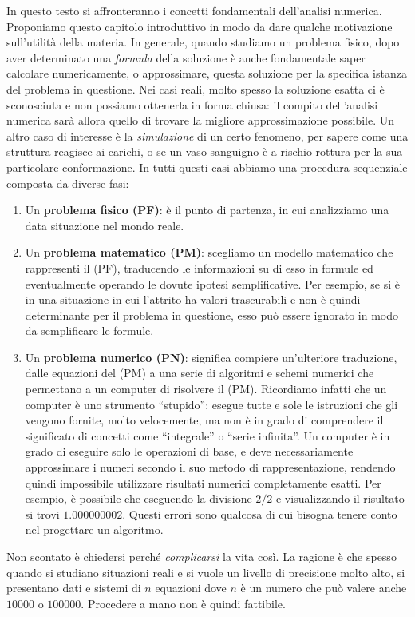 In questo testo si affronteranno i concetti fondamentali dell'analisi numerica.
Proponiamo questo capitolo introduttivo in modo da dare qualche motivazione sull'utilità della materia.
In generale, quando studiamo un problema fisico, dopo aver determinato una \textit{formula} della soluzione è anche fondamentale saper calcolare numericamente, o approssimare, questa soluzione per la specifica istanza del problema in questione.
Nei casi reali, molto spesso la soluzione esatta ci è sconosciuta e non possiamo ottenerla in forma chiusa: il compito dell'analisi numerica sarà allora quello di trovare la migliore approssimazione possibile.
Un altro caso di interesse è la \textit{simulazione} di un certo fenomeno, per sapere come una struttura reagisce ai carichi, o se un vaso sanguigno è a rischio rottura per la sua particolare conformazione. In tutti questi casi abbiamo una procedura sequenziale composta da diverse fasi:
\begin{enumerate}
	\item Un \textbf{problema fisico (PF)}: è il punto di partenza, in cui analizziamo una data situazione nel mondo reale.
	\item Un \textbf{problema matematico (PM)}: scegliamo un modello matematico che rappresenti il (PF), traducendo le informazioni su di esso in formule ed eventualmente operando le dovute ipotesi semplificative.
  Per esempio, se si è in una situazione in cui l'attrito ha valori trascurabili e non è quindi determinante per il problema in questione, esso può essere ignorato in modo da semplificare le formule.
	\item Un \textbf{problema numerico (PN)}: significa compiere un'ulteriore traduzione, dalle equazioni del (PM) a una serie di algoritmi e schemi numerici che permettano a un computer di risolvere il (PM).
  Ricordiamo infatti che un computer è uno strumento ``stupido'': esegue tutte e sole le istruzioni che gli vengono fornite, molto velocemente, ma non è in grado di comprendere il significato di concetti come ``integrale'' o ``serie infinita''.
  Un computer è in grado di eseguire solo le operazioni di base, e deve necessariamente approssimare i numeri secondo il suo metodo di rappresentazione, rendendo quindi impossibile utilizzare risultati numerici completamente esatti.
  Per esempio, è possibile che eseguendo la divisione $2/2$ e visualizzando il risultato si trovi $1.000000002$.
  Questi errori sono qualcosa di cui bisogna tenere conto nel progettare un algoritmo.
\end{enumerate}
Non scontato è chiedersi perché \textit{complicarsi} la vita così.
La ragione è che spesso quando si studiano situazioni reali e si vuole un livello di precisione molto alto, si presentano dati e sistemi di $n$ equazioni dove $n$ è un numero che può valere anche $10 000$ o $100 000$.
Procedere a mano non è quindi fattibile.

